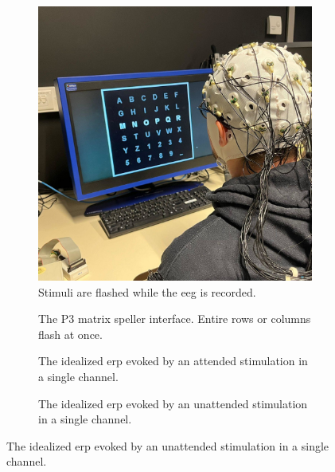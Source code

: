 \begin{figure}[t]
  \begin{subfigure}[t]{.45\textwidth}
  \includegraphics[width=\textwidth, height=\textwidth]{figures/bci/illustration}
    \caption{Stimuli are flashed while the \acs{eeg} is recorded.}
  \end{subfigure}\hfill%
  \begin{subfigure}[t]{.45\textwidth}
    
    \caption{The P3 matrix speller interface. Entire rows or columns flash at once.}
  \end{subfigure}

  \bigskip

  \begin{subfigure}[t]{.45\textwidth}
    \caption{The idealized \ac{erp} evoked by an attended stimulation in a single
    channel.}%
    \label{fig:bci/erp}%
  \end{subfigure}\hfill%
  \begin{subfigure}[t]{.45\textwidth}
    
    \caption{The idealized \ac{erp} evoked by an unattended stimulation in a single
    channel.}%
    \label{fig:bci/erp}%
  \end{subfigure}%
\end{figure}

